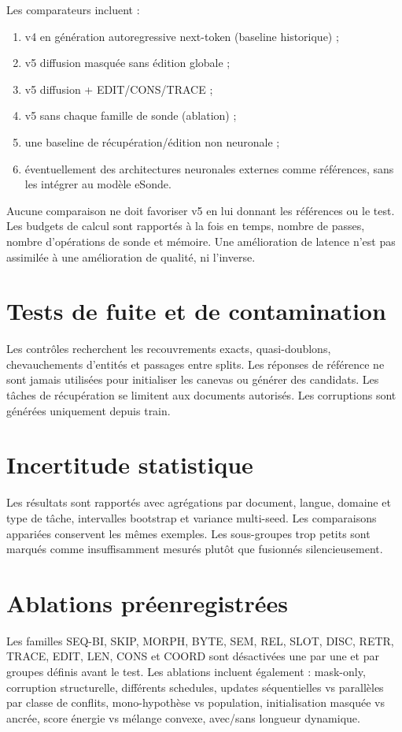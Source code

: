 \documentclass[11pt,a4paper,oneside]{report}
\begin{document}
Les comparateurs incluent :
\begin{enumerate}
\item v4 en génération autoregressive next-token (baseline historique) ;
\item v5 diffusion masquée sans édition globale ;
\item v5 diffusion + EDIT/CONS/TRACE ;
\item v5 sans chaque famille de sonde (ablation) ;
\item une baseline de récupération/édition non neuronale ;
\item éventuellement des architectures neuronales externes comme références, sans les intégrer au modèle eSonde.
\end{enumerate}
Aucune comparaison ne doit favoriser v5 en lui donnant les références ou le test. Les budgets de calcul sont rapportés à la fois en temps, nombre de passes, nombre d'opérations de sonde et mémoire. Une amélioration de latence n'est pas assimilée à une amélioration de qualité, ni l'inverse.

\section{Tests de fuite et de contamination}
Les contrôles recherchent les recouvrements exacts, quasi-doublons, chevauchements d'entités et passages entre splits. Les réponses de référence ne sont jamais utilisées pour initialiser les canevas ou générer des candidats. Les tâches de récupération se limitent aux documents autorisés. Les corruptions sont générées uniquement depuis train.

\section{Incertitude statistique}
Les résultats sont rapportés avec agrégations par document, langue, domaine et type de tâche, intervalles bootstrap et variance multi-seed. Les comparaisons appariées conservent les mêmes exemples. Les sous-groupes trop petits sont marqués comme insuffisamment mesurés plutôt que fusionnés silencieusement.

\section{Ablations préenregistrées}
Les familles SEQ-BI, SKIP, MORPH, BYTE, SEM, REL, SLOT, DISC, RETR, TRACE, EDIT, LEN, CONS et COORD sont désactivées une par une et par groupes définis avant le test. Les ablations incluent également : mask-only, corruption structurelle, différents schedules, updates séquentielles vs parallèles par classe de conflits, mono-hypothèse vs population, initialisation masquée vs ancrée, score énergie vs mélange convexe, avec/sans longueur dynamique.
\end{document}
